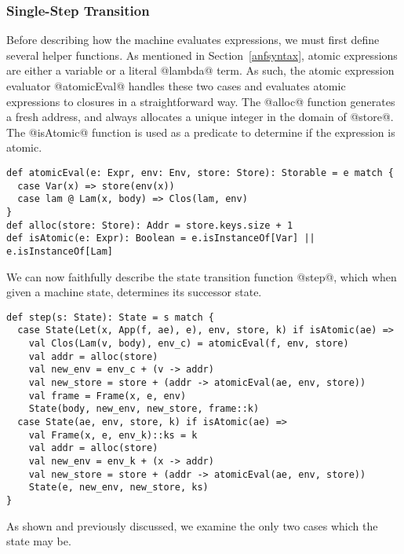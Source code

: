 \documentclass[acmsmall]{acmart}\settopmatter{}
\begin{document}
\subsubsection{Single-Step Transition}
Before describing how the machine evaluates expressions, we must first define several helper
functions. As mentioned in Section~\ref{anfsyntax}, atomic expressions are either a variable
or a literal @lambda@ term. As such, the atomic expression evaluator @atomicEval@ handles
these two cases and evaluates atomic expressions to closures in a straightforward way.
The @alloc@ function generates a fresh address, and always allocates a unique integer
in the domain of @store@.
The @isAtomic@ function is used as a predicate to determine if the expression is atomic.

\begin{lstlisting}
def atomicEval(e: Expr, env: Env, store: Store): Storable = e match {
  case Var(x) => store(env(x))
  case lam @ Lam(x, body) => Clos(lam, env)
}
def alloc(store: Store): Addr = store.keys.size + 1
def isAtomic(e: Expr): Boolean = e.isInstanceOf[Var] || e.isInstanceOf[Lam]
\end{lstlisting}

We can now faithfully describe the state transition function @step@,
which when given a machine state, determines its successor state.

\begin{lstlisting}
def step(s: State): State = s match {
  case State(Let(x, App(f, ae), e), env, store, k) if isAtomic(ae) =>
    val Clos(Lam(v, body), env_c) = atomicEval(f, env, store)
    val addr = alloc(store)
    val new_env = env_c + (v -> addr)
    val new_store = store + (addr -> atomicEval(ae, env, store))
    val frame = Frame(x, e, env)
    State(body, new_env, new_store, frame::k)
  case State(ae, env, store, k) if isAtomic(ae) =>
    val Frame(x, e, env_k)::ks = k
    val addr = alloc(store)
    val new_env = env_k + (x -> addr)
    val new_store = store + (addr -> atomicEval(ae, env, store))
    State(e, new_env, new_store, ks)
}
\end{lstlisting}

As shown and previously discussed, we examine the only two cases which the state may be.
\end{document}
